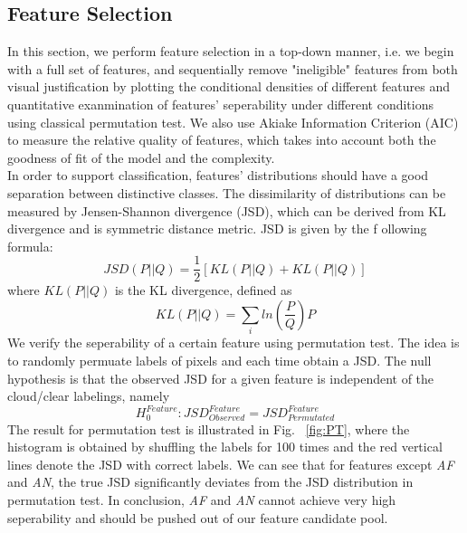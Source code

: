 \documentclass[english]{article}\usepackage{graphicx, color}
\numberwithin{equation}{section}
\numberwithin{figure}{section}
\begin{document}
\subsection{Feature Selection}
In this section, we perform feature selection in a top-down manner, i.e. we 
begin with a full set of features, and sequentially remove "ineligible" 
features from both visual justification by plotting the conditional densities
of different features and quantitative exanmination of features' seperability 
under different conditions using classical permutation test. We also use 
Akiake Information Criterion (AIC) to measure the relative quality of features, 
which takes into account both the goodness of fit of the model and the 
complexity.\\

In order to support classification, features' distributions should have a good 
separation between distinctive classes. The dissimilarity of distributions can 
be measured by Jensen-Shannon divergence (JSD), which can be derived 
from KL divergence and is symmetric distance metric. JSD is given by the f
ollowing formula:
\begin{equation}
JSD(P||Q) = \frac{1}{2} [KL(P||Q) + KL(P||Q)]
\end{equation}
where $KL(P||Q)$ is the KL divergence, defined as 
\begin{equation}
KL(P||Q) = \sum_i{ln(\frac{P}{Q})P}
\end{equation}
We verify the seperability of a certain feature using permutation test. The idea 
is to randomly permuate labels of pixels and each time obtain a JSD. The null 
hypothesis is that the observed JSD for a given feature is independent of the 
cloud/clear labelings, namely
\begin{equation}
H_0^{Feature}:JSD_{Observed}^{Feature}=JSD_{Permutated}^{Feature}
\end{equation}
The result for permutation test is illustrated in Fig. ~\ref{fig:PT}, where the 
histogram is obtained by shuffling the labels 
for 100 times and the red vertical lines 
denote the JSD with correct labels. We can see that for features except 
\textit{AF} and \textit{AN}, the true JSD significantly deviates from the JSD 
distribution in permutation test. In conclusion, \textit{AF} and \textit{AN} 
cannot achieve very high seperability and should be pushed out of our 
feature candidate pool.
\end{document}
